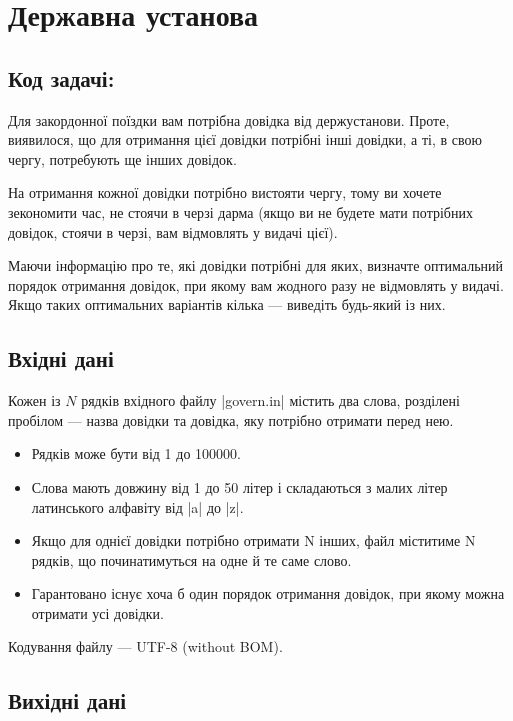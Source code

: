 \documentclass[12pt,a4paper]{article}
\begin{document}
\section*{Державна установа \hfill {}}


\subsection*{Код задачі: }

Для закордонної поїздки вам потрібна довідка від держустанови. Проте, виявилося, що для отримання цієї довідки потрібні інші довідки, а ті, в свою чергу, потребують ще інших довідок.

На отримання кожної довідки потрібно вистояти чергу, тому ви хочете зекономити час, не стоячи в черзі дарма (якщо ви не будете мати потрібних довідок, стоячи в черзі, вам відмовлять у видачі цієї).

Маючи інформацію про те, які довідки потрібні для яких, визначте оптимальний порядок отримання довідок, при якому вам жодного разу не відмовлять у видачі. Якщо таких оптимальних варіантів кілька --- виведіть будь-який із них.


\subsection*{Вхідні дані}

Кожен із \(N\) рядків вхідного файлу |govern.in| містить два слова, розділені пробілом --- назва довідки та довідка, яку потрібно отримати перед нею.

\begin{itemize}
    \item Рядків може бути від 1 до 100000.
    \item Слова мають довжину від 1 до 50 літер і складаються з малих літер латинського алфавіту від |a| до |z|.
    \item Якщо для однієї довідки потрібно отримати N інших, файл міститиме N рядків, що починатимуться на одне й те саме слово.
    \item Гарантовано існує хоча б один порядок отримання довідок, при якому можна отримати усі довідки.
\end{itemize}

Кодування файлу --- UTF-8 (without BOM).


\subsection*{Вихідні дані}
\end{document}
